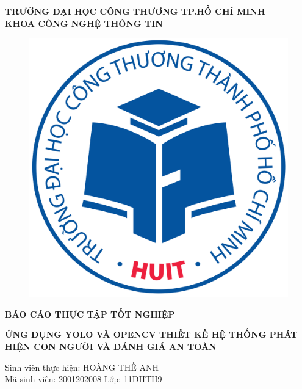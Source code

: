 
\begin{center}
	\fontsize{16}{20}\selectfont
	\textbf{TRƯỜNG ĐẠI HỌC CÔNG THƯƠNG TP.HỒ CHÍ MINH\\ 
		\textbf{KHOA CÔNG NGHỆ THÔNG TIN}}
	
	\vspace{0.8cm}
	\begin{figure}[htp]
		\begin{center}
			\includegraphics[scale=0.08]{images/logo.png}
		\end{center}
	\end{figure}
	\vspace{1cm}
	\fontsize{24}{20}\selectfont\textbf{BÁO CÁO THỰC TẬP TỐT NGHIỆP\\}
	
	\vspace{3cm}
	\fontsize{24}{20}\selectfont\textbf{ỨNG DỤNG YOLO VÀ OPENCV THIẾT KẾ HỆ THỐNG PHÁT HIỆN CON NGƯỜI VÀ ĐÁNH GIÁ AN TOÀN}
\end{center}
\vspace{2cm}
\begin{center}
	\fontsize{14}{20}\selectfont\textit{}{Sinh viên thực hiện: HOÀNG THẾ ANH}\\
	\fontsize{14}{20}\selectfont\textit{}{Mã sinh viên: 2001202008 Lớp: 11DHTH9}

\end{center}
\pagebreak